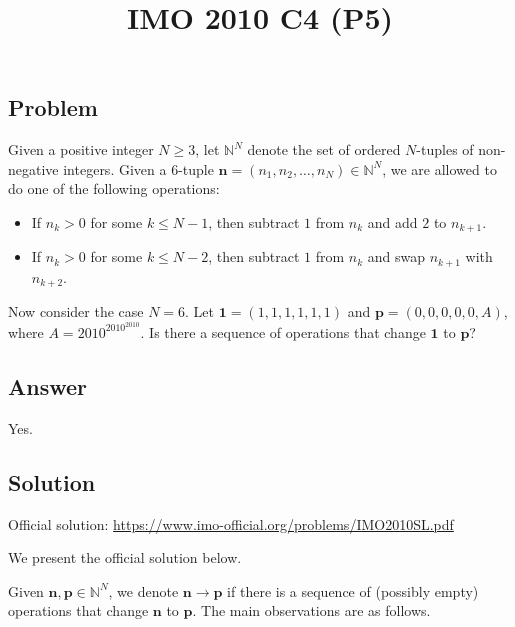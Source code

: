 \documentclass{article}
\title{IMO 2010 C4 (P5)}
\author{}
\date{}
\newcommand{\N}{\mathbb{N}}
\begin{document}
\maketitle



\subsection*{Problem}

Given a positive integer $N \geq 3$, let $\N^N$ denote the set of ordered $N$-tuples of non-negative integers.
Given a $6$-tuple $\mathbf{n} = (n_1, n_2, \ldots, n_N) \in \N^N$, we are allowed to do one of the following operations:
\begin{itemize}
    \item   If $n_k > 0$ for some $k \leq N - 1$, then subtract $1$ from $n_k$ and add $2$ to $n_{k + 1}$.
    \item   If $n_k > 0$ for some $k \leq N - 2$, then subtract $1$ from $n_k$ and swap $n_{k + 1}$ with $n_{k + 2}$.
\end{itemize}
Now consider the case $N = 6$.
Let $\mathbf{1} = (1, 1, 1, 1, 1, 1)$ and $\mathbf{p} = (0, 0, 0, 0, 0, A)$, where $A = 2010^{2010^{2010}}$.
Is there a sequence of operations that change $\mathbf{1}$ to $\mathbf{p}$?



\subsection*{Answer}

Yes.



\subsection*{Solution}

Official solution: \url{https://www.imo-official.org/problems/IMO2010SL.pdf}

We present the official solution below.

Given $\mathbf{n}, \mathbf{p} \in \N^N$, we denote $\mathbf{n} \to \mathbf{p}$ if there is a sequence of (possibly empty) operations that change $\mathbf{n}$ to $\mathbf{p}$.
The main observations are as follows.
\end{document}

